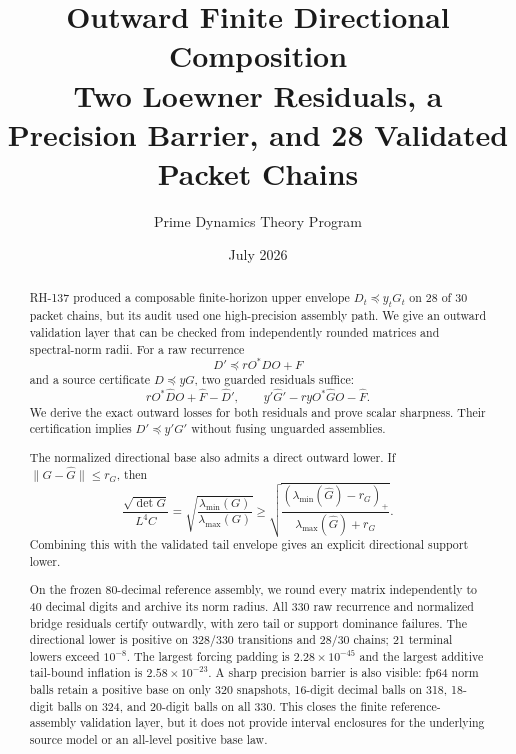 \documentclass[12pt]{article}
\title{Outward Finite Directional Composition\\\large Two Loewner Residuals, a Precision Barrier, and 28 Validated Packet Chains}
\author{Prime Dynamics Theory Program}
\date{July 2026}
\begin{document}
\maketitle

\begin{abstract}
RH-137 produced a composable finite-horizon upper envelope $D_t\preceq
y_tG_t$ on 28 of 30 packet chains, but its audit used one high-precision
assembly path.  We give an outward validation layer that can be checked from
independently rounded matrices and spectral-norm radii.  For a raw recurrence
\[
 D'\preceq rO^*DO+F
\]
and a source certificate $D\preceq yG$, two guarded residuals suffice:
\[
 rO^*\widehat DO+\widehat F-\widehat D',
 \qquad
 y'\widehat G'-ryO^*\widehat GO-\widehat F.
\]
We derive the exact outward losses for both residuals and prove scalar
sharpness.  Their certification implies $D'\preceq y'G'$ without fusing
unguarded assemblies.

The normalized directional base also admits a direct outward lower.  If
$\|G-\widehat G\|\leq r_G$, then
\[
 \frac{\sqrt{\det G}}{L^4C}
 =\sqrt{\frac{\lambda_{\min}(G)}{\lambda_{\max}(G)}}
 \geq
 \sqrt{\frac{(\lambda_{\min}(\widehat G)-r_G)_+}
 {\lambda_{\max}(\widehat G)+r_G}}.
\]
Combining this with the validated tail envelope gives an explicit
directional support lower.

On the frozen 80-decimal reference assembly, we round every matrix
independently to 40 decimal digits and archive its norm radius.  All 330 raw
recurrence and normalized bridge residuals certify outwardly, with zero tail
or support dominance failures.  The directional lower is positive on
328/330 transitions and 28/30 chains; 21 terminal lowers exceed $10^{-8}$.
The largest forcing padding is $2.28\times10^{-45}$ and the largest additive
tail-bound inflation is $2.58\times10^{-23}$.  A sharp precision barrier is
also visible: fp64 norm balls retain a positive base on only 320 snapshots,
16-digit decimal balls on 318, 18-digit balls on 324, and 20-digit balls on
all 330.  This closes the finite reference-assembly validation layer, but it
does not provide interval enclosures for the underlying source model or an
all-level positive base law.
\end{abstract}
\end{document}
